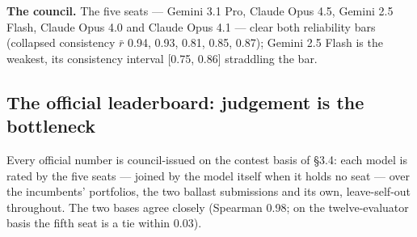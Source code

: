 \documentclass{article}
\begin{document}
\textbf{The council.} The five seats --- Gemini 3.1 Pro, Claude Opus 4.5, Gemini 2.5 Flash, Claude Opus 4.0 and Claude Opus 4.1 --- clear both reliability bars (collapsed consistency \(\bar r\) 0.94, 0.93, 0.81, 0.85, 0.87); Gemini 2.5 Flash is the weakest, its consistency interval {[}0.75, 0.86{]} straddling the bar.

\subsection{The official leaderboard: judgement is the bottleneck}\label{the-official-leaderboard-judgement-is-the-bottleneck}

Every official number is council-issued on the contest basis of \S{}3.4: each model is rated by the five seats --- joined by the model itself when it holds no seat --- over the incumbents' portfolios, the two ballast submissions and its own, leave-self-out throughout. The two bases agree closely (Spearman 0.98; on the twelve-evaluator basis the fifth seat is a tie within 0.03).
\end{document}
